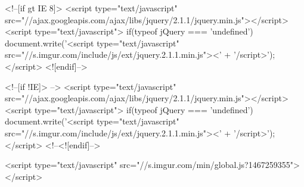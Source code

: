 <!--[if gt IE 8]>
<script type="text/javascript" src="//ajax.googleapis.com/ajax/libs/jquery/2.1.1/jquery.min.js"></script>
<script type="text/javascript">
if(typeof jQuery === 'undefined') {
    document.write('<script type="text/javascript" src="//s.imgur.com/include/js/ext/jquery.2.1.1.min.js"><' + '/script>');
}
</script>
<![endif]-->

<!--[if !IE]> -->
<script type="text/javascript" src="//ajax.googleapis.com/ajax/libs/jquery/2.1.1/jquery.min.js"></script>
<script type="text/javascript">
if(typeof jQuery === 'undefined') {
    document.write('<script type="text/javascript" src="//s.imgur.com/include/js/ext/jquery.2.1.1.min.js"><' + '/script>');
}
</script>
<!--<![endif]-->



        <script type="text/javascript" src="//s.imgur.com/min/global.js?1467259355"></script>

